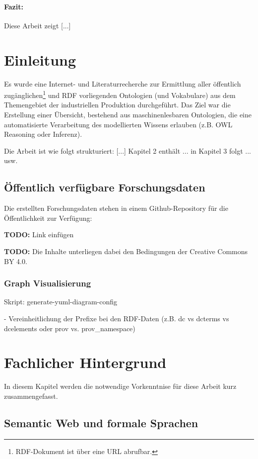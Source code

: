 \documentclass{article}
\begin{document}
\paragraph{Fazit:} Diese Arbeit zeigt [...]

\newpage

\section{Einleitung}

Es wurde eine Internet- und Literaturrecherche zur Ermittlung aller öffentlich zugänglichen\footnote{RDF-Dokument ist über eine URL abrufbar.} und RDF vorliegenden Ontologien (und Vokabulare) aus dem Themengebiet der industriellen Produktion durchgeführt.
Das Ziel war die Erstellung einer Übersicht, bestehend aus maschinenlesbaren Ontologien, die eine automatisierte Verarbeitung des modellierten Wissens erlauben (z.B. OWL Reasoning oder Inferenz).

Die Arbeit ist wie folgt strukturiert: [...] Kapitel 2 enthält ... in Kapitel 3 folgt ... usw.

\subsection{Öffentlich verfügbare Forschungsdaten}

Die erstellten Forschungsdaten stehen in einem Github-Repository für die Öffentlichkeit zur Verfügung:

\textbf{TODO:} Link einfügen

\textbf{TODO:} Die Inhalte unterliegen dabei den Bedingungen der Creative Commons BY 4.0.

\subsubsection{Graph Visualisierung}

Skript: generate-yuml-diagram-config

- Vereinheitlichung der Prefixe bei den RDF-Daten (z.B. dc vs dcterms vs dcelements oder prov vs. prov\_namespace)

\section{Fachlicher Hintergrund}

In diesem Kapitel werden die notwendige Vorkenntnise für diese Arbeit kurz zusammengefasst.

\subsection{Semantic Web und formale Sprachen}
\end{document}
